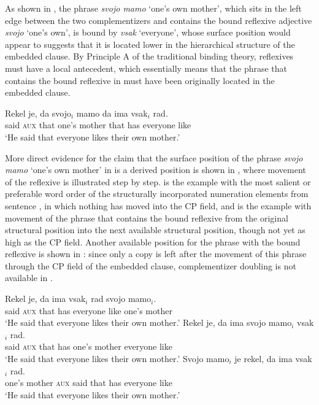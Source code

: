 \documentclass[output=paper,
]{langscibook}
\begin{document}
As shown in , the phrase \textit{svojo mamo} `one’s own mother', which sits in the left edge between the two complementizers and contains the bound reflexive adjective \textit{svojo} `one’s own', is bound by \textit{vsak} `everyone', whose surface position would appear to suggests that it is located lower in the hierarchical structure of the embedded clause. By Principle A of the traditional binding theory, reflexives must have a local antecedent, which essentially means that the phrase that contains the bound reflexive in  must have been originally located in the embedded clause.

\begin{exe} 
\ex \label{ex:plesnicar:four}
\gll Rekel	je,	da	svojo$_i$	mamo		da	ima	vsak$_i$		rad. \\
	said	\textsc{aux}	that	one’s	mother		that	has	everyone	like\\
\trans `He said that everyone likes their own mother.' 
\end{exe}

\noindent More direct evidence for the claim that the surface position of the phrase \textit{svojo mamo} `one’s own mother' in  is a derived position is shown in , where movement of the reflexive is illustrated step by step.  is the example with the most salient or preferable word order of the structurally incorporated numeration elements from sentence , in which nothing has moved into the CP field, and  is the example with movement of the phrase that contains the bound reflexive from the original structural position into the next available structural position, though not yet as high as the CP field. Another available position for the phrase with the bound reflexive is shown in  : since only a copy is left after the movement of this phrase through the CP field of the embedded clause, complementizer doubling is not available in .

\begin{exe} 
\ex \begin{xlist} \label{ex:plesnicar:five}
\ex \label{ex:plesnicar:fivea}\gll Rekel	je,	da	ima	vsak$_i$		rad	svojo	mamo$_i$.\\
	said	\textsc{aux}	that	has	everyone	like	one’s mother \\
\trans `He said that everyone likes their own mother.'
\ex \label{ex:plesnicar:fiveb}
\gll	Rekel	je,	da	ima	svojo	mamo$_i$	vsak$_i$		rad. 	\\
	said	\textsc{aux} that	has	one’s	mother	everyone	like \\
\trans `He said that everyone likes their own mother.'
\ex \label{ex:plesnicar:fivec}
\gll	Svojo	mamo$_i$	je	rekel,	da	ima	vsak$_i$		rad. 	\\
	one’s	mother	\textsc{aux} 	said	that	has	everyone	like \\
\trans `He said that everyone likes their own mother.'
\end{xlist}\end{exe}
\end{document}
